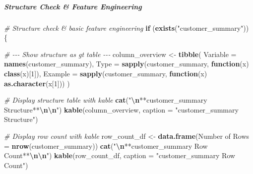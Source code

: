 \documentclass[
]{article}
\newenvironment{Shaded}{\begin{snugshade}}{\end{snugshade}}
\newcommand{\AttributeTok}[1]{\textcolor[rgb]{0.13,0.29,0.53}{#1}}
\newcommand{\CommentTok}[1]{\textcolor[rgb]{0.56,0.35,0.01}{\textit{#1}}}
\newcommand{\ControlFlowTok}[1]{\textcolor[rgb]{0.13,0.29,0.53}{\textbf{#1}}}
\newcommand{\DecValTok}[1]{\textcolor[rgb]{0.00,0.00,0.81}{#1}}
\newcommand{\FunctionTok}[1]{\textcolor[rgb]{0.13,0.29,0.53}{\textbf{#1}}}
\newcommand{\NormalTok}[1]{#1}
\newcommand{\OtherTok}[1]{\textcolor[rgb]{0.56,0.35,0.01}{#1}}
\newcommand{\SpecialCharTok}[1]{\textcolor[rgb]{0.81,0.36,0.00}{\textbf{#1}}}
\newcommand{\StringTok}[1]{\textcolor[rgb]{0.31,0.60,0.02}{#1}}
\begin{document}
\subparagraph{Structure Check \& Feature
Engineering}\label{structure-check-feature-engineering}

\begin{Shaded}
\begin{Highlighting}[]
\CommentTok{\# Structure check \& basic feature engineering}
\ControlFlowTok{if}\NormalTok{ (}\FunctionTok{exists}\NormalTok{(}\StringTok{"customer\_summary"}\NormalTok{)) \{}

  \CommentTok{\# {-}{-}{-} Show structure as gt table {-}{-}{-}}
\NormalTok{  column\_overview }\OtherTok{\textless{}{-}} \FunctionTok{tibble}\NormalTok{(}
    \AttributeTok{Variable =} \FunctionTok{names}\NormalTok{(customer\_summary),}
    \AttributeTok{Type =} \FunctionTok{sapply}\NormalTok{(customer\_summary, }\ControlFlowTok{function}\NormalTok{(x) }\FunctionTok{class}\NormalTok{(x)[}\DecValTok{1}\NormalTok{]),}
    \AttributeTok{Example =} \FunctionTok{sapply}\NormalTok{(customer\_summary, }\ControlFlowTok{function}\NormalTok{(x) }\FunctionTok{as.character}\NormalTok{(x[}\DecValTok{1}\NormalTok{]))}
\NormalTok{  )}

  \CommentTok{\# Display structure table with kable}
  \FunctionTok{cat}\NormalTok{(}\StringTok{"}\SpecialCharTok{\textbackslash{}n}\StringTok{**customer\_summary Structure**}\SpecialCharTok{\textbackslash{}n\textbackslash{}n}\StringTok{"}\NormalTok{)}
  \FunctionTok{kable}\NormalTok{(column\_overview, }\AttributeTok{caption =} \StringTok{"customer\_summary Structure"}\NormalTok{)}

  \CommentTok{\# Display row count with kable}
\NormalTok{  row\_count\_df }\OtherTok{\textless{}{-}} \FunctionTok{data.frame}\NormalTok{(}\StringTok{\textasciigrave{}}\AttributeTok{Number of Rows}\StringTok{\textasciigrave{}} \OtherTok{=} \FunctionTok{nrow}\NormalTok{(customer\_summary))}
  \FunctionTok{cat}\NormalTok{(}\StringTok{"}\SpecialCharTok{\textbackslash{}n}\StringTok{**customer\_summary Row Count**}\SpecialCharTok{\textbackslash{}n\textbackslash{}n}\StringTok{"}\NormalTok{)}
  \FunctionTok{kable}\NormalTok{(row\_count\_df, }\AttributeTok{caption =} \StringTok{"customer\_summary Row Count"}\NormalTok{)}


\end{Highlighting}
\end{Shaded}
\end{document}
